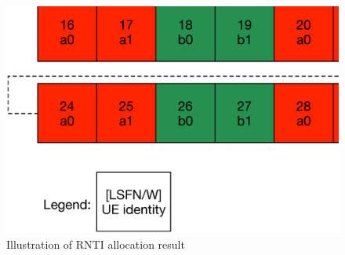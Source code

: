 \begin{figure}[!t]
	\centering
	\includegraphics[width=\linewidth]{Chapter6/Figures/Anexampleallocation}
	\caption{Illustration of RNTI allocation result}
	\label{fig:Illustration-Resource-Allocation}
\end{figure}
